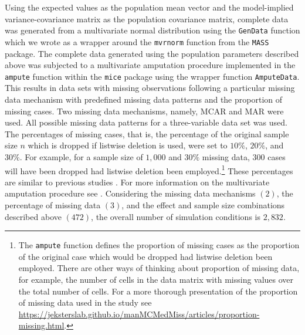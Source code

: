 \documentclass[man]{apa7}\usepackage[]{graphicx}\usepackage[]{xcolor}
\begin{document}
Using the expected values as the population mean vector
and the model-implied variance-covariance matrix
as the population covariance matrix,
complete data was generated from a multivariate normal distribution
using the \texttt{GenData} function which we wrote as a wrapper around the \texttt{mvrnorm} function
from the \texttt{MASS} package.
The complete data generated using the population parameters described above
was subjected to a multivariate amputation procedure
implemented in the \texttt{ampute} function \parencite{Lib-Missing-Data-Schouten-2018a}
within the \texttt{mice} package using the wrapper function \texttt{AmputeData}.
This results in data sets with missing observations
following a particular missing data mechanism
with predefined missing data patterns and the proportion of missing cases.
Two missing data mechanisms,
namely, MCAR
and MAR were used.
All possible missing data patterns for a three-variable data set was used.
The percentages of missing cases,
that is,
the percentage of the original sample size $n$ which is dropped if listwise deletion is used,
were set to $10\%$, $20\%$, and $30\%$.
For example,
for a sample size of $1,000$
and $30\%$ missing data,
$300$ cases will have been dropped had listwise deletion been employed.\footnote{
	The \texttt{ampute} function defines the proportion of missing cases as the proportion of the original case which would be dropped had listwise deletion been employed. There are other ways of thinking about proportion of missing data, for example, the number of cells in the data matrix with missing values over the total number of cells. For a more thorough presentation of the proportion of missing data used in the study see \url{https://jeksterslab.github.io/manMCMedMiss/articles/proportion-missing.html}.
}
These percentages are similar to previous studies
\parencite{Lib-Mediation-Missing-Data-Zhang-2012,
Lib-Mediation-Missing-Data-Zhang-2015}.
For more information on the multivariate amputation procedure
see
\Textcite{Lib-Missing-Data-Schouten-2018a}.
Considering the missing data mechanisms $\left( 2 \right)$, the percentage of missing data $\left( 3 \right)$,
and the effect and sample size combinations
described above $\left( 472 \right)$,
the overall number of simulation conditions is $2,832$.
\end{document}
